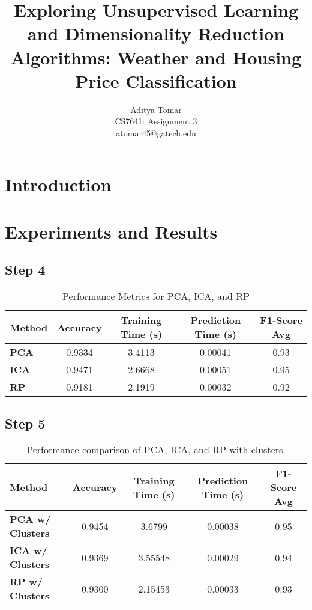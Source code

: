\documentclass[conference]{IEEEtran}
\title{Exploring Unsupervised Learning and Dimensionality Reduction Algorithms: Weather and Housing Price Classification}
\author{Aditya Tomar \\ CS7641: Assignment 3 \\ atomar45@gatech.edu}
\begin{document}
\maketitle

\begin{abstract}

\end{abstract}

\section{Introduction}


\section{Experiments and Results}
\subsection{Step 4}
  \begin{table}[h]
  \centering
  \caption{Performance Metrics for PCA, ICA, and RP}
  \label{tab:performance_metrics}
  \begin{tabular}{lcccc}
    \toprule
    \textbf{Method} & \textbf{Accuracy} & \textbf{Training Time (s)} & \textbf{Prediction Time (s)} & \textbf{F1-Score Avg} \\
    \midrule
    \textbf{PCA} & 0.9334 & 3.4113 & 0.00041 & 0.93 \\
    \textbf{ICA} & 0.9471 & 2.6668 & 0.00051 & 0.95 \\
    \textbf{RP}  & 0.9181 & 2.1919 & 0.00032 & 0.92 \\
    \bottomrule
  \end{tabular}
\end{table}


\subsection{Step 5}

\begin{table}[h]
    \centering
        \caption{Performance comparison of PCA, ICA, and RP with clusters.}
    \label{tab:performance_comparison}
    \begin{tabular}{lcccc}
        \toprule
         \textbf{Method} & \textbf{Accuracy} & \textbf{Training Time (s)} & \textbf{Prediction Time (s)} & \textbf{F1-Score Avg} \\
        \midrule
        \textbf{PCA w/ Clusters} & 0.9454 & 3.6799 & 0.00038 & 0.95\\
        \textbf{ICA w/ Clusters} & 0.9369 & 3.55548 & 0.00029 & 0.94\\
        \textbf{RP w/ Clusters} & 0.9300 & 2.15453 & 0.00033 & 0.93\\
        \bottomrule
        
    \end{tabular}

\end{table}
\end{document}
